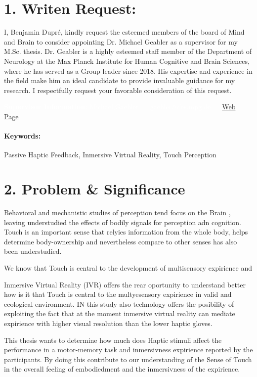 \documentclass[12pt,oneside,openright]{report}
\makeatletter
\newcommand{\supervisor}{Michael,Gaebler --- gaebler@cbs.mpg.de --- \href{https://www.cbs.mpg.de/person/gaebler/371395}{Web Page}.

}
\newcommand{\skills}{Passive Haptic Feedback, Inmersive Virtual Reality, Touch Perception}
\makeatother
\begin{document}
\section*{1. Writen Request:}
I, Benjamin Dupré, kindly request the esteemed members of the board of Mind and Brain to consider appointing Dr. Michael Geabler as a supervisor for my M.Sc. thesis. Dr. Geabler is a highly esteemed staff member of the Department of Neurology at the Max Planck Institute for Human Cognitive and Brain Sciences, where he has served as a Group leader since 2018. His expertise and experience in the field make him an ideal candidate to provide invaluable guidance for my research. I respectfully request your favorable consideration of this request.

\vspace*{0,5cm}

{\colorbox{boxcl}{\parbox[b][][r]{0.85\textwidth}{\textcolor{white}{\textbf{Supervisor Information:} \supervisor}}}}

\paragraph{\textbf{Keywords:}}\skills{}


\section*{2. Problem \& Significance}

Behavioral and mechanistic studies of perception tend focus on the Brain \cite{10.7554/eLife.64812}, leaving understudied the effects of bodily signals for perception adn cognition. Touch is an important sense that relyies information from the whole body, helps determine body-ownership and nevertheless compare to other senses has also been understudied. 

We know that Touch is central to the development of multisensory expirience\cite{BREMNER2017227} and 

Inmersive Virtual Reality (IVR) offers the rear oportunity to understand better how is it that Touch is central to the multyesensory expirience in valid and ecological environment. IN this study also  technology offers the posibility of exploiting the fact that at the moment inmersive virtual reality can mediate expirience with higher visual resolution than the lower haptic gloves. 

This thesis wants to determine how much does Haptic stimuli affect the performance in a motor-memory task and inmersivness expirience reported by the participants. By doing this contribute to our understanding of the Sense of Touch in the overall feeling of embodiedment and the inmersivness of the expirience. 
\end{document}
